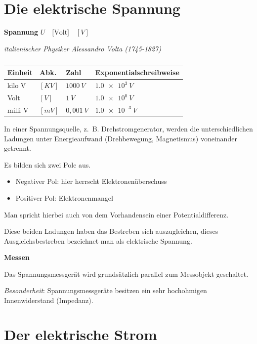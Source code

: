 \section{Die elektrische Spannung}\label{die-elektrische-spannung}

\textbf{Spannung} $U \quad \text{[Volt]} \quad [V]$

\emph{italienischer Physiker Alessandro Volta (1745-1827)}

\begin{table}[!ht]%
\centering 
	\caption{}%
\begin{tabular}{@{}llll@{}}
\hline
\textbf{Einheit} & \textbf{Abk.} & \textbf{Zahl} &
\textbf{Exponentialschreibweise} \\
\hline
kilo V & $[KV]$ & $1000~V$ & $\num{1,0e3}~V$ \\
Volt & $[V]$ & $1~V$ & $\num{1,0e0}~V$ \\
milli V & $[mV]$ & $0,001~V$ & $\num{1,0e-3}~V$ \\
\hline
\end{tabular} 
\end{table}

In einer Spannungsquelle, z.~B. Drehstromgenerator, werden die
unterschiedlichen Ladungen unter Energieaufwand (Drehbewegung,
Magnetismus) voneinander getrennt.

Es bilden sich zwei Pole aus.

\begin{itemize}
\item
  Negativer Pol: hier herrscht Elektronenüberschuss
\item
  Positiver Pol: Elektronenmangel
\end{itemize}

Man spricht hierbei auch von dem Vorhandensein einer Potentialdifferenz.

Diese beiden Ladungen haben das Bestreben sich auszugleichen, dieses
Ausgleichsbestreben bezeichnet man als elektrische Spannung.

\textbf{Messen}

Das Spannungsmessgerät wird grundsätzlich parallel zum Messobjekt
geschaltet.

\emph{Besonderheit}: Spannungsmessgeräte besitzen ein sehr hochohmigen
Innenwiderstand (Impedanz).

\newpage

\section{Der elektrische Strom}\label{der-elektrische-strom}


